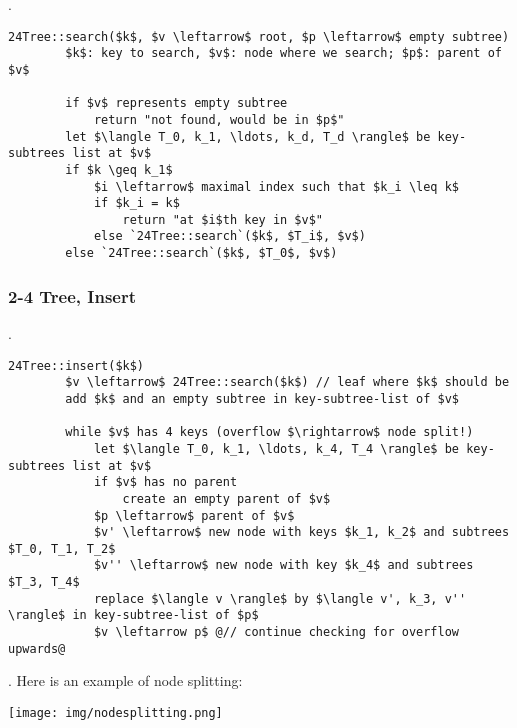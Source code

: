\documentclass{article}
\begin{document}
\begin{codes}[].
    \begin{lstlisting}[style=cppstyle]
        24Tree::search($k$, $v \leftarrow$ root, $p \leftarrow$ empty subtree)
        $k$: key to search, $v$: node where we search; $p$: parent of $v$
        
        if $v$ represents empty subtree
            return "not found, would be in $p$"
        let $\langle T_0, k_1, \ldots, k_d, T_d \rangle$ be key-subtrees list at $v$
        if $k \geq k_1$
            $i \leftarrow$ maximal index such that $k_i \leq k$
            if $k_i = k$
                return "at $i$th key in $v$"
            else `24Tree::search`($k$, $T_i$, $v$)
        else `24Tree::search`($k$, $T_0$, $v$)
    \end{lstlisting}
\end{codes}

\subsubsection{2-4 Tree, Insert}

\begin{codes}[].
    \begin{lstlisting}[style=cppstyle]
    24Tree::insert($k$)
        $v \leftarrow$ 24Tree::search($k$) // leaf where $k$ should be
        add $k$ and an empty subtree in key-subtree-list of $v$

        while $v$ has 4 keys (overflow $\rightarrow$ node split!)
            let $\langle T_0, k_1, \ldots, k_4, T_4 \rangle$ be key-subtrees list at $v$
            if $v$ has no parent
                create an empty parent of $v$
            $p \leftarrow$ parent of $v$
            $v' \leftarrow$ new node with keys $k_1, k_2$ and subtrees $T_0, T_1, T_2$
            $v'' \leftarrow$ new node with key $k_4$ and subtrees $T_3, T_4$
            replace $\langle v \rangle$ by $\langle v', k_3, v'' \rangle$ in key-subtree-list of $p$
            $v \leftarrow p$ @// continue checking for overflow upwards@
    \end{lstlisting}
\end{codes}

\begin{examplee}[].
    Here is an example of node splitting: \begin{center}
        \texttt{[image: img/nodesplitting.png]}
    \end{center}
\end{examplee}
\end{document}
